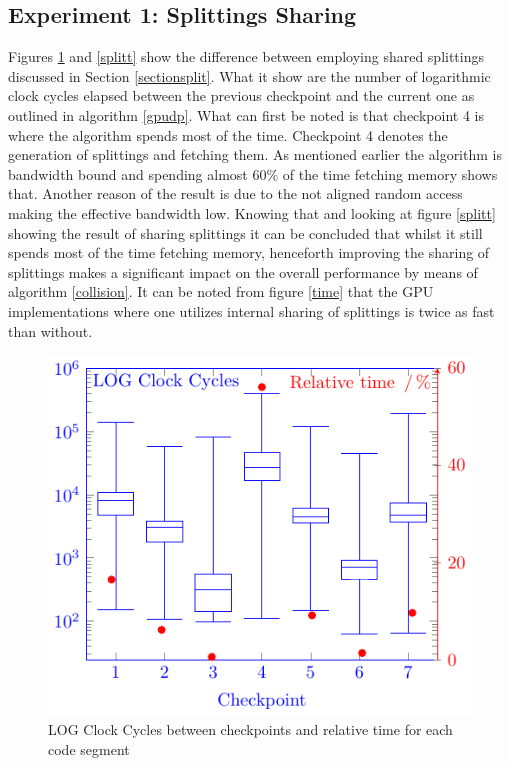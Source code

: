 \documentclass{llncs}
\begin{document}
% 
%
%
%
\subsection{Experiment 1: Splittings Sharing} %
Figures \ref{nosplitt} and \ref{splitt} show the difference between employing shared splittings discussed in Section \ref{sectionsplit}. 
What it show are the number of logarithmic clock cycles elapsed between the 
previous checkpoint and the current one as outlined in algorithm \ref{gpudp}.
What can first be noted is that checkpoint 4 is where the algorithm spends most of the time. 
Checkpoint 4 denotes the generation of splittings and fetching them.
As mentioned earlier the algorithm is bandwidth bound and spending almost
$60\%$ of the time fetching memory shows that. Another reason of the result
is due to the not aligned random access making the effective bandwidth low.
Knowing that and looking at figure \ref{splitt} showing the result of sharing splittings it can be concluded that whilst it still spends most  of the time fetching memory, henceforth improving the sharing of splittings makes a significant impact on the overall performance by means of algorithm \ref{collision}. It can be noted from figure \ref{time} that the GPU implementations where one utilizes internal sharing of splittings is twice as fast than without.
\begin{figure}[htbp]\centering
\includegraphics[width=0.8\columnwidth]{fig3cycles}
\caption{LOG Clock Cycles between checkpoints and relative time for each code segment\label{nosplitt}}
\end{figure}
\end{document}
